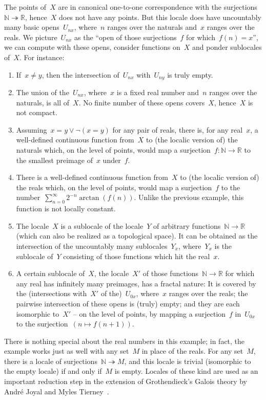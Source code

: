 \documentclass{ws-rv9x6}
\newcommand{\NN}{\mathbb{N}}
\newcommand{\RR}{\mathbb{R}}
\renewcommand{\_}{\mathpunct{.}}
\newcommand{\?}{\,{:}\,}
\begin{document}
The points of~$X$ are in canonical one-to-one correspondence with the
surjections~$\NN \twoheadrightarrow \RR$, hence~$X$ does not have any points.
But this locale does have uncountably many basic opens~$U_{nx}$, where~$n$
ranges over the naturals and~$x$ ranges over the reals. We picture~$U_{nx}$ as
the ``open of those surjections~$f$ for which~$f(n) = x$'', we can compute with
these opens, consider functions on~$X$ and ponder sublocales of~$X$. For instance:
\begin{enumerate}
\item If~$x \neq y$, then the intersection of~$U_{nx}$ with~$U_{ny}$
is truly empty.
\item The union of the~$U_{nx}$, where~$x$ is a fixed real
number and~$n$ ranges over the naturals, is all of~$X$. No finite number
of these opens covers~$X$, hence~$X$ is not compact.
\item Assuming~$x = y \vee \neg(x = y)$ for any pair of reals, there is, for any real~$x$, a well-defined continuous function from~$X$ to
(the localic version of) the naturals which, on the level of points, would map
a surjection~$f : \NN \to \RR$ to the smallest preimage of~$x$ under~$f$.
\item There is a well-defined continuous function from~$X$ to (the localic
version of) the reals which, on the level of points, would map a surjection~$f$
to the number~$\sum_{n=0}^\infty 2^{-n} \arctan(f(n))$. Unlike the previous
example, this function is not locally constant.
\item\label{item:intersection-sublocales} The locale~$X$ is a sublocale of the
locale~$Y$ of arbitrary functions~$\NN \to \RR$ (which can also be realized as
a topological space). It can be obtained as the intersection of the uncountably
many sublocales~$Y_x$, where~$Y_x$ is the sublocale of~$Y$ consisting of those
functions which hit the real~$x$.
\item A certain sublocale of~$X$, the locale~$X'$ of those functions~$\NN \to
\RR$ for which any real has infinitely many preimages, has a fractal nature: It
is covered by the (intersections with~$X'$ of the)~$U_{0x}$, where~$x$ ranges over the reals; the pairwise
intersection of these opens is (truly) empty; and they are each isomorphic
to~$X'$ -- on the level of points, by mapping a surjection~$f$ in~$U_{0x}$ to
the surjection~$(n \mapsto f(n+1))$.
\end{enumerate}

There is nothing special about the real numbers in this example;
in fact, the example works just as well with any set~$M$ in place of the reals.
For any set~$M$, there is a locale of surjections~$\NN \twoheadrightarrow M$,
and this locale is trivial (isomorphic to the empty locale) if and only if~$M$
is empty. Locales of these kind are used as an important reduction step in the
extension of Grothendieck's Galois theory by André Joyal and
Myles Tierney~\cite[Section~V.3]{joyal-tierney:galois-theory}.
\end{document}

